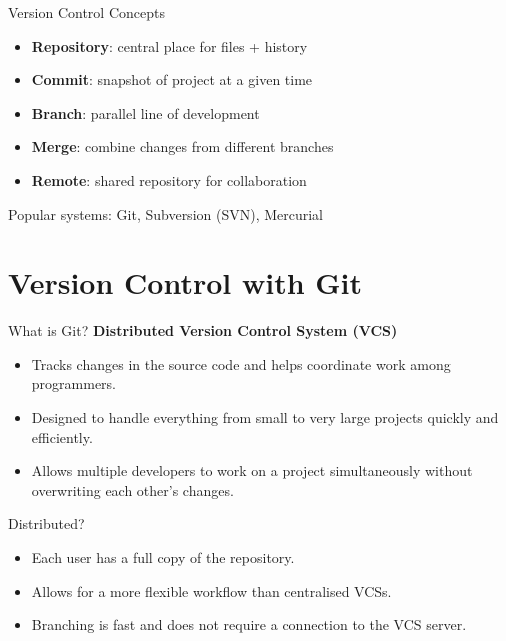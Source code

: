 \begin{frame}{Version Control Concepts}
	\begin{itemize}
		\item \textbf{Repository}: central place for files + history
		\item \textbf{Commit}: snapshot of project at a given time
		\item \textbf{Branch}: parallel line of development
		\item \textbf{Merge}: combine changes from different branches
		\item \textbf{Remote}: shared repository for collaboration
	\end{itemize}
	\vspace{0.5em}
	Popular systems: Git, Subversion (SVN), Mercurial  
\end{frame}


\section{Version Control with Git}
\begin{frame}
	\begin{block}{What is Git?}
		\textbf{Distributed Version Control System (VCS)} 
		\begin{itemize}
			\item Tracks changes in the source code and helps coordinate work among programmers.
			\item Designed to handle everything from small to very large projects quickly and efficiently. 
			\item Allows multiple developers to work on a project simultaneously without overwriting each other's changes. 
		\end{itemize}
	\end{block}
	
	\begin{block}{Distributed?}
		\justifying
		\begin{itemize}
			\item Each user has a full copy of the repository.
			\item Allows for a more flexible workflow than centralised VCSs.
			\item Branching is fast and does not require a connection to the VCS server.
		\end{itemize}
	\end{block}
	
\end{frame}


